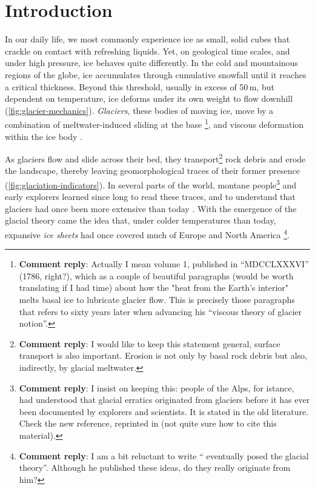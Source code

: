 \documentclass{article}
\newcommand{\renote}[1]{\footnote{\textbf{Comment reply}: #1}}
\begin{document}
\newpage
\tableofcontents
\newpage

\section{Introduction}

In our daily life, we most commonly experience ice as small, solid cubes
that crackle on contact with refreshing liquids. Yet, on geological
time scales, and under high pressure, ice behaves quite differently.
In the cold and mountainous regions of the globe, ice accumulates through
cumulative snowfall until it reaches a critical thickness. Beyond this
threshold, usually in excess of 50\,m, but dependent on temperature, ice
deforms under its own weight to flow downhill (\cref{fig:glacier-mechanics}).
\emph{Glaciers}, these bodies of moving ice, move by a combination of
meltwater-induced sliding at the base \citep[\S532]{Saussure.1786}\renote{
    Actually I mean volume 1, published in ``MDCCLXXXVI'' (1786, right?),
    which as a couple of beautiful paragraphs (would be worth
    translating if I had time) about how the "heat from the Earth's interior"
    melts basal ice to lubricate glacier flow. This is precisely those
    paragraphs that \citet{Forbes.1846} refers to sixty years later when
    advancing his ``viscous theory of glacier notion''.},
and viscous deformation within the
ice body \citep{Forbes.1846b}.

As glaciers flow and slide across their bed, they transport\renote{
    I would like to keep this statement general, surface transport is also
    important. Erosion is not only by basal rock debris but also, indirectly,
    by glacial meltwater.}
rock debris and erode the landscape, thereby leaving geomorphological traces of
their former presence (\cref{fig:glaciation-indicators}). In several parts of
the world, montane people\renote{
    I insist on keeping this: people of the Alps, for istance, had understood
    that glacial erratics originated from glaciers before it has ever been
    documented by explorers and scientists. It is stated in the old literature.
    Check the new reference, reprinted in \citet{Mathews.1898} (not quite sure
    how to cite this material).}
and early explorers learned since long to read these traces, and to
understand that glaciers had once been more extensive than today
\citep[e.g.,][p.~21]{Windham.Martel.1744}. With the emergence of the glacial
theory came the idea that, under colder temperatures
than today, expansive \emph{ice sheets} had once covered much of Europe and
North America \citep{Agassiz.1840}\renote{
    I am a bit reluctant to write ``\citet{Agassiz.1840} eventually posed the
    glacial theory''. Although he published these ideas, do they really
    originate from him?}.
\end{document}
